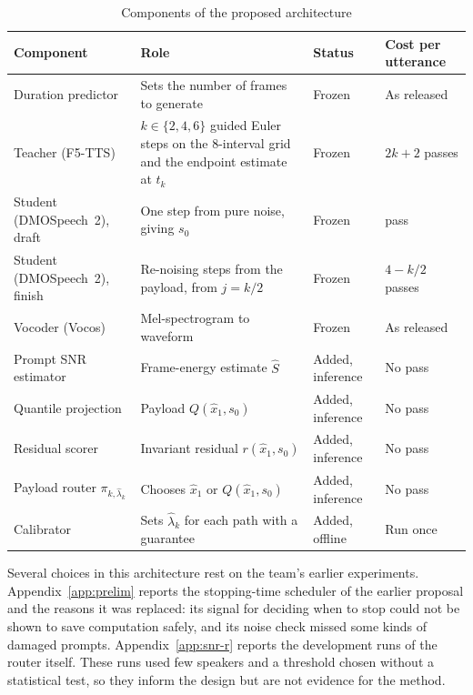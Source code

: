 \begin{table}[!htbp]
\centering\small
\caption{Components of the proposed architecture}
\label{tab:components}
\begin{tabularx}{\textwidth}{@{}>{\raggedright\arraybackslash}p{3.1cm} >{\raggedright\arraybackslash}X >{\raggedright\arraybackslash}p{2.3cm} >{\raggedright\arraybackslash}p{2.5cm}@{}}
\toprule
\textbf{Component} & \textbf{Role} & \textbf{Status} & \textbf{Cost per utterance} \\
\midrule
Duration predictor & Sets the number of frames to generate & Frozen & As released \\
Teacher (F5-TTS) & $k\in\{2,4,6\}$ guided Euler steps on the 8-interval grid and the endpoint estimate at $t_k$ & Frozen & $2k+2$ passes \\
Student (DMOSpeech~2), draft & One step from pure noise, giving $s_0$ & Frozen & 1 pass \\
Student (DMOSpeech~2), finish & Re-noising steps from the payload, from $j=k/2$ & Frozen & $4-k/2$ passes \\
Vocoder (Vocos) & Mel-spectrogram to waveform & Frozen & As released \\
Prompt SNR estimator & Frame-energy estimate $\hat S$ & Added, inference & No pass \\
Quantile projection & Payload $Q(\hat x_1,s_0)$ & Added, inference & No pass \\
Residual scorer & Invariant residual $r(\hat x_1,s_0)$ & Added, inference & No pass \\
Payload router $\pi_{k,\hat\lambda_k}$ & Chooses $\hat x_1$ or $Q(\hat x_1,s_0)$ & Added, inference & No pass \\
Calibrator & Sets $\hat\lambda_k$ for each path with a guarantee & Added, offline & Run once \\
\bottomrule
\end{tabularx}
\end{table}

Several choices in this architecture rest on the team's earlier experiments. Appendix~\ref{app:prelim} reports the stopping-time scheduler of the earlier proposal and the reasons it was replaced: its signal for deciding when to stop could not be shown to save computation safely, and its noise check missed some kinds of damaged prompts. Appendix~\ref{app:snr-r} reports the development runs of the router itself. These runs used few speakers and a threshold chosen without a statistical test, so they inform the design but are not evidence for the method.

